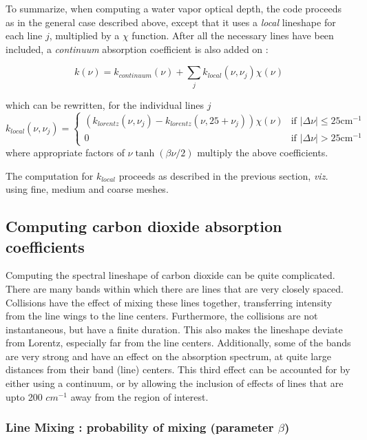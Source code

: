 \documentclass[11pt]{article}
\begin{document}
To summarize, when computing a water vapor optical depth, the code proceeds
as in the general case described above, except that it uses a {\it local} 
lineshape for each line $j$, multiplied by a $\chi$ function. After all the 
necessary lines have been included, a {\it continuum} absorption coefficient
is also added on : 

\[
k(\nu) = k_{continuum}(\nu) + \sum_{j} k_{local}(\nu,\nu_{j}) \chi(\nu)
\]

which can be rewritten, for the individual lines $j$
\[
k_{local}(\nu,\nu_{j}) = 
\left\{
\begin{array}{cl}
     ( k_{lorentz}(\nu,\nu_{j}) - k_{lorentz}(\nu,25+\nu_{j}) ) 
           \chi(\nu)    & \mbox{if $|\Delta\nu| \leq 25 \mbox{cm}^{-1}$} \\
        0               & \mbox{if $|\Delta\nu| > 25 \mbox{cm}^{-1}$}
\end{array}
\right. 
\]
where appropriate factors of $\nu\tanh\left(\beta\nu/2\right)$ 
multiply the above coefficients. 

The computation for $k_{local}$ proceeds as described in the previous 
section, {\em viz.} using fine, medium and coarse meshes.

\subsection{Computing carbon dioxide absorption coefficients}

Computing the spectral lineshape of carbon dioxide can be quite complicated.
There are many bands within which there are lines that are very closely 
spaced. Collisions have the effect of mixing these lines together,
transferring intensity from the line wings to the line centers. Furthermore,
the  collisions are not instantaneous, but have a finite duration. This 
also makes the lineshape deviate from Lorentz, especially far from the line
centers. Additionally, some of the bands are very strong and have an 
effect on the absorption spectrum, at
quite large distances from their band (line) centers. This third effect can
be accounted for by either using a continuum, or by allowing the inclusion
of effects of lines that are upto 200 $cm^{-1}$ away from the region of 
interest.

\subsubsection{Line Mixing : probability of mixing (parameter $\beta$)}
\end{document}

